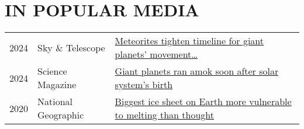 \section{IN POPULAR MEDIA}

\begin{tabular}{l l l} 
2024 & Sky \& Telescope & \href{https://skyandtelescope.org/astronomy-news/meteorites-tighten-timeline-for-giant-planets-movement-through-the-solar-system/}{Meteorites tighten timeline for giant planets' movement\dots}
\\
2024 & Science Magazine & \href{https://www.science.org/content/article/giant-planets-ran-amok-soon-after-solar-system-s-birth}{Giant planets ran amok soon after solar system's birth}
\\
2020 & National Geographic & \href{https://www.nationalgeographic.com/science/article/east-antarctic-ice-sheet-more-vulnerable-to-melting-than-thought}{Biggest ice sheet on Earth more vulnerable to melting than thought}
\end{tabular}